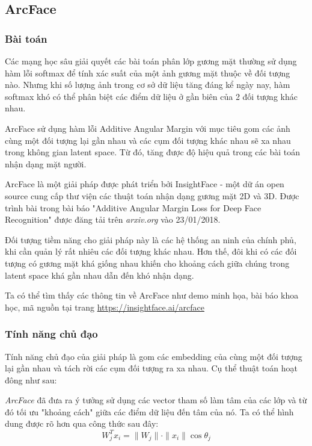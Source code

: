 \subsection{ArcFace}
\subsubsection{Bài toán}
Các mạng học sâu giải quyết các bài toán phân lớp gương mặt thường sử dụng hàm lỗi softmax để tính xác suất của một ảnh gương mặt thuộc về đối tượng nào. Nhưng khi số lượng ảnh trong cơ sở dữ liệu tăng đáng kể ngày nay, hàm softmax khó có thể phân biệt các điểm dữ liệu ở gần biên của 2 đối tượng khác nhau.

ArcFace sử dụng hàm lỗi Additive Angular Margin với mục tiêu gom các ảnh cùng một đối tượng lại gần nhau và các cụm đối tượng khác nhau sẽ xa nhau trong không gian latent space. Từ đó, tăng được độ hiệu quả trong các bài toán nhận dạng mặt người.

ArcFace là một giải pháp được phát triển bởi InsightFace - một dữ án open source cung cấp thư viện các thuật toán nhận dạng gương mặt 2D và 3D. Được trình bài trong bài báo "Additive Angular Margin Loss for Deep Face Recognition" được đăng tải trên \textit{arxiv.org} vào 23/01/2018.

Đối tượng tiềm năng cho giải pháp này là các hệ thống an ninh của chính phủ, khi cần quản lý rất nhiêu các đối tượng khác nhau. Hơn thế, đôi khi có các đối tượng có gương mặt khá giống nhau khiến cho khoảng cách giữa chúng trong latent space khá gần nhau dẫn đến khó nhận dạng.

Ta có thể tìm thấy các thông tin về ArcFace như demo minh họa, bài báo khoa học, mã nguồn tại trang \url{https://insightface.ai/arcface}

\subsubsection{Tính năng chủ đạo}
Tính năng chủ đạo của giải pháp là gom các embedding của cùng một đối tượng lại gần nhau và tách rời các cụm đối tượng ra xa nhau. Cụ thể thuật toán hoạt đông như sau:

\textit{ArcFace} đã đưa ra ý tưởng sử dụng các vector tham số làm tâm của các lớp và từ đó tối ưu "khoảng cách" giữa các điểm dữ liệu đến tâm của nó. Ta có thể hình dung được rõ hơn qua công thức sau đây:
\begin{equation}
    W_{j}^{T}x_i = \|W_j\|\cdot\|x_i\|\cos{\theta_j}
\end{equation}

